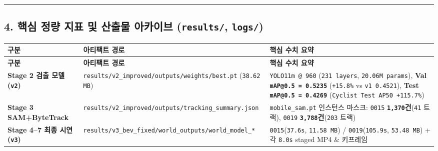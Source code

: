 \documentclass[10.5pt,a4paper]{article}
\begin{document}
\par\noindent\rule{\textwidth}{0.4pt}\par\medskip

\subsection{4. 핵심 정량 지표 및 산출물 아카이브 (\texttt{results/\allowbreak{}}, \texttt{logs/\allowbreak{}})}


\begin{footnotesize}
\setlength{\tabcolsep}{4pt}
\setlength{\LTleft}{0pt}\setlength{\LTright}{0pt}
\begin{longtable}{>{\raggedright\arraybackslash}p{} >{\raggedright\arraybackslash}p{} >{\raggedright\arraybackslash}p{}}
\toprule
\textbf{구분} & \textbf{아티팩트 경로} & \textbf{핵심 수치 요약} \\
\midrule
\endfirsthead
\toprule
\textbf{구분} & \textbf{아티팩트 경로} & \textbf{핵심 수치 요약} \\
\midrule
\endhead
\bottomrule
\endfoot
\textbf{Stage 2 검출 모델 (\texttt{v2})} & \texttt{results/\allowbreak{}v2\_\allowbreak{}improved/\allowbreak{}outputs/\allowbreak{}weights/\allowbreak{}best.\allowbreak{}pt} (\texttt{38.\allowbreak{}62 MB}) & \texttt{YOLO11m @ 960} (\texttt{231 layers}, \texttt{20.\allowbreak{}06M params}), \textbf{Val \texttt{mAP@0.\allowbreak{}5 = 0.\allowbreak{}5235}} (\texttt{+15.\allowbreak{}8\%} vs \texttt{v1 0.\allowbreak{}4521}), \textbf{Test \texttt{mAP@0.\allowbreak{}5 = 0.\allowbreak{}4269}} (\texttt{Cyclist Test AP50 +115.\allowbreak{}7\%}) \\
\textbf{Stage 3 SAM+ByteTrack} & \texttt{results/\allowbreak{}v2\_\allowbreak{}improved/\allowbreak{}outputs/\allowbreak{}tracking\_\allowbreak{}summary.\allowbreak{}json} & \texttt{mobile\_\allowbreak{}sam.\allowbreak{}pt} 인스턴스 마스크: \texttt{0015} \textbf{\texttt{1,\allowbreak{}370}건}(\texttt{41} 트랙), \texttt{0019} \textbf{\texttt{3,\allowbreak{}788}건}(\texttt{203} 트랙) \\
\textbf{Stage 4--7 최종 시연 (\texttt{v3})} & \texttt{results/\allowbreak{}v3\_\allowbreak{}bev\_\allowbreak{}fixed/\allowbreak{}world\_\allowbreak{}outputs/\allowbreak{}world\_\allowbreak{}model\_\allowbreak{}*} & \texttt{0015}(\texttt{37.\allowbreak{}6s}, \texttt{11.\allowbreak{}58 MB}) / \texttt{0019}(\texttt{105.\allowbreak{}9s}, \texttt{53.\allowbreak{}48 MB}) + 각 \texttt{8.\allowbreak{}0s} staged MP4 \& 키프레임 \\

\end{longtable}
\end{footnotesize}
\end{document}

